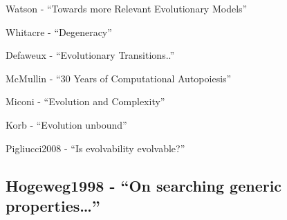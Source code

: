 		Watson - ``Towards more Relevant Evolutionary Models''
		
		Whitacre - ``Degeneracy''
		
		Defaweux - ``Evolutionary Transitions..''
		
		McMullin - ``30 Years of Computational Autopoiesis''
		
		Miconi - ``Evolution and Complexity''
		
		Korb - ``Evolution unbound''
		
		Pigliucci2008 - ``Is evolvability evolvable?''
		
		\hypertarget{hogeweg1998---on-searching-generic-properties}{\subsection{Hogeweg1998
				- ``On searching generic
				properties\ldots{}''}\label{hogeweg1998---on-searching-generic-properties}}
		
